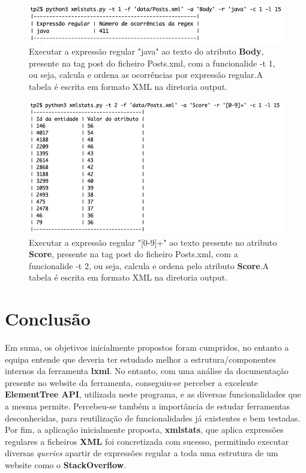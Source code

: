 \documentclass[11pt,a4paper]{report}%
\begin{document}
\begin{figure}[h]
	\centering
	\includegraphics[scale=0.6]{2.png}
	\caption{Executar a expressão regular "java" ao texto do atributo \textbf{Body}, presente na tag post do ficheiro Posts.xml, com a funcionalide -t 1, ou seja, calcula e ordena as ocorrências por expressão regular.A tabela é escrita em formato XML na diretoria output.}
	\label{img:2}
\end{figure}

\begin{figure}[h]
	\centering
	\includegraphics[scale=0.6]{3.png}
	\caption{Executar a expressão regular "[0-9]+" ao texto presente no atributo \textbf{Score}, presente na tag post do ficheiro Posts.xml, com a funcionalide -t 2, ou seja, calcula e ordena pelo atributo \textbf{Score}.A tabela é escrita em formato XML na diretoria output.}
	\label{img:3}
\end{figure}

\chapter{Conclusão} 
Em suma, os objetivos inicialmente propostos foram cumpridos, no entanto a equipa entende que deveria ter estudado melhor a estrutura/componentes internos da ferramenta \textbf{lxml}. \newline No entanto, com uma análise da documentação presente no website da ferramenta, conseguiu-se perceber a excelente \textbf{ElementTree API}, utilizada neste programa, e as diversas funcionalidades que a mesma permite. Percebeu-se também a importância de estudar ferramentas desconhecidas, para reutilização de funcionalidades já existentes e bem testadas.
\newline Por fim, a aplicação inicialmente proposta, \textbf{xmlstats}, que aplica expressões regulares a ficheiros \textbf{XML} foi concretizada com sucesso, permitindo executar diversas \emph{queries} apartir de expressões regular a toda uma estrutura de um website como o \textbf{StackOverflow}.
\end{document}
